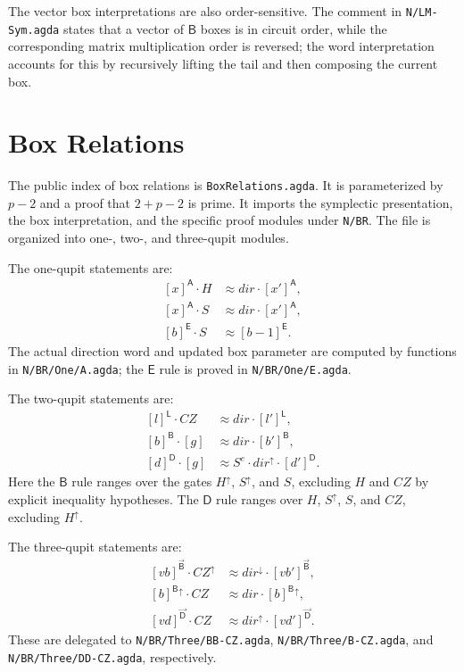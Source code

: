 \documentclass[sigplan,screen,review,anonymous]{acmart}
\newcommand{\ABox}{\mathsf{A}}
\newcommand{\BBox}{\mathsf{B}}
\newcommand{\DBox}{\mathsf{D}}
\newcommand{\EBox}{\mathsf{E}}
\newcommand{\LBox}{\mathsf{L}}
\newcommand{\file}[1]{\texttt{#1}}
\begin{document}
The vector box interpretations are also order-sensitive.  The comment
in \file{N/LM-Sym.agda} states that a vector of \(\BBox\) boxes is in
circuit order, while the corresponding matrix multiplication order is
reversed; the word interpretation accounts for this by recursively
lifting the tail and then composing the current box.

\section{Box Relations}

The public index of box relations is \file{BoxRelations.agda}.  It is
parameterized by \(p-2\) and a proof that \(2+p-2\) is prime.  It
imports the symplectic presentation, the box interpretation, and the
specific proof modules under \file{N/BR}.  The file is organized into
one-, two-, and three-qupit modules.

The one-qupit statements are:
\[
\begin{aligned}
[x]^\ABox \cdot H &\approx dir \cdot [x']^\ABox,\\
[x]^\ABox \cdot S &\approx dir \cdot [x']^\ABox,\\
[b]^\EBox \cdot S &\approx [b-1]^\EBox.
\end{aligned}
\]
The actual direction word and updated box parameter are computed by
functions in \file{N/BR/One/A.agda}; the \(\EBox\) rule is proved in
\file{N/BR/One/E.agda}.

The two-qupit statements are:
\[
\begin{aligned}
[l]^\LBox \cdot CZ &\approx dir \cdot [l']^\LBox,\\
[b]^\BBox \cdot [g] &\approx dir \cdot [b']^\BBox,\\
[d]^\DBox \cdot [g] &\approx S^e \cdot dir^\uparrow \cdot [d']^\DBox.
\end{aligned}
\]
Here the \(\BBox\) rule ranges over the gates \(H^\uparrow\),
\(S^\uparrow\), and \(S\), excluding \(H\) and \(CZ\) by explicit
inequality hypotheses.  The \(\DBox\) rule ranges over \(H\),
\(S^\uparrow\), \(S\), and \(CZ\), excluding \(H^\uparrow\).

The three-qupit statements are:
\[
\begin{aligned}
[vb]^{\vec{\BBox}} \cdot CZ^\uparrow
  &\approx dir^\downarrow \cdot [vb']^{\vec{\BBox}},\\
[b]^\BBox{}^\uparrow \cdot CZ
  &\approx dir \cdot [b]^\BBox{}^\uparrow,\\
[vd]^{\vec{\DBox}} \cdot CZ
  &\approx dir^\uparrow \cdot [vd']^{\vec{\DBox}}.
\end{aligned}
\]
These are delegated to \file{N/BR/Three/BB-CZ.agda},
\file{N/BR/Three/B-CZ.agda}, and
\file{N/BR/Three/DD-CZ.agda}, respectively.
\end{document}
